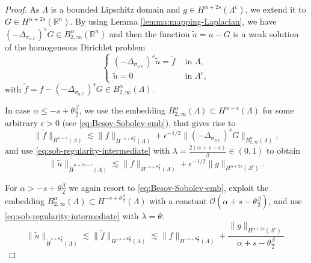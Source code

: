\documentclass{amsart}
\newcommand{\domain}{\Lambda}
\newcommand{\snl}{{\sigma_{n\ell}}}
\def\R{{\mathbb R}}
\theoremstyle{plain}
\numberwithin{equation}{section}
\numberwithin{table}{section}
\numberwithin{figure}{section}
\numberwithin{theorem}{section}
\numberwithin{corollary}{section}
\numberwithin{definition}{section}
\numberwithin{lemma}{section}
\numberwithin{proposition}{section}
\numberwithin{remark}{section}
\begin{document}
\begin{proof}
As  $\domain$ is a bounded Lipschitz domain and $g \in H^{\alpha+2s}(\domain^c)$, we extend it to $G \in H^{\alpha+2s}(\R^n)$. By using Lemma \ref{lemma:mapping-Laplacian}, we have $(-\Delta_\snl)^s G \in B^{\alpha}_{2,\infty}(\R^n)$ and then the function $\tilde u = u - G$ is a weak solution of the homogeneous Dirichlet problem
\[
 \left\lbrace \begin{aligned}
(-\Delta_\snl)^s \tilde u = \tilde f & \mbox{ in } \domain, \\
\tilde u = 0 & \mbox{ in } \domain^c,
\end{aligned} \right.
\]
with $\tilde f =  f  - (-\Delta_\snl)^s G \in B^{\alpha}_{2,\infty}(\domain)$. 

In case $\alpha \le -s + \theta \frac\beta{2}$, we use the embedding $B^{\alpha}_{2,\infty}(\domain) \subset H^{\alpha -\epsilon}(\domain)$ for some arbitrary $\epsilon > 0$ (see \eqref{eq:Besov-Sobolev-emb}), that gives rise to 
\[
\| \tilde f  \|_{H^{\alpha -\epsilon}(\domain)} \lesssim \| f  \|_{H^{-s + \theta \frac\beta{2}}(\domain)} + \epsilon^{-1/2} \| (-\Delta_\snl)^s G \|_{B^{\alpha}_{2,\infty}(\domain)},
\]
and use \eqref{eq:sob-regularity-intermediate} with $\lambda = \frac{2(\alpha+s-\epsilon)}\beta \in (0,1)$ to obtain
\[
  \| \tilde u \|_{\widetilde{H}^{\alpha +2s - \epsilon}(\domain)} \lesssim  \| f  \|_{H^{-s + \theta \frac\beta{2}}(\domain)} + \epsilon^{-1/2} \| g \|_{H^{\alpha+2s} (\domain^c)} .
\]

For $\alpha > -s + \theta \frac\beta2$ we again resort to \eqref{eq:Besov-Sobolev-emb}, exploit the embedding $B^{\alpha}_{2,\infty}(\domain) \subset H^{-s+\theta\frac\beta2}(\domain)$ 
with a constant $\mathcal{O}(\alpha+s-\theta\frac\beta2)$,
and  use \eqref{eq:sob-regularity-intermediate} with $\lambda = \theta$:
\[
  \| \tilde u \|_{\widetilde H^{s+\theta \frac\beta2}(\domain)} \lesssim  \| \tilde f  \|_{H^{-s+\theta\frac\beta2}(\domain)} \lesssim  
  \| f  \|_{H^{-s+\theta\frac\beta2}(\domain)} + \frac{ \| g \|_{H^{\alpha+2s} (\domain^c)}}{\alpha+s-\theta\frac\beta2} .
\]
\end{proof}
\end{document}
